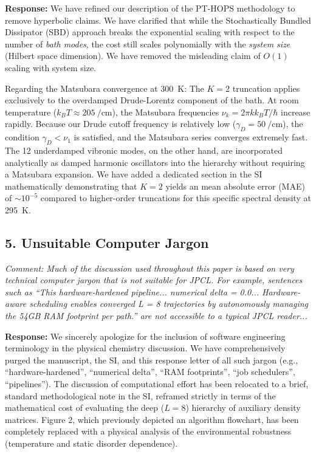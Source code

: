 \documentclass[11pt]{article}
\begin{document}
\textbf{Response:} We have refined our description of the PT-HOPS methodology to remove hyperbolic claims. We have clarified that while the Stochastically Bundled Dissipator (SBD) approach breaks the exponential scaling with respect to the number of \textit{bath modes}, the cost still scales polynomially with the \textit{system size} (Hilbert space dimension). We have removed the misleading claim of $O(1)$ scaling with system size.

Regarding the Matsubara convergence at \SI{300}{\kelvin}: The $K=2$ truncation applies exclusively to the overdamped Drude-Lorentz component of the bath. At room temperature ($k_B T \approx \SI{205}{\per\centi\meter}$), the Matsubara frequencies $\nu_k = 2\pi k k_B T / \hbar$ increase rapidly. Because our Drude cutoff frequency is relatively low ($\gamma_D = \SI{50}{\per\centi\meter}$), the condition $\gamma_D < \nu_1$ is satisfied, and the Matsubara series converges extremely fast. The 12 underdamped vibronic modes, on the other hand, are incorporated analytically as damped harmonic oscillators into the hierarchy without requiring a Matsubara expansion. We have added a dedicated section in the SI mathematically demonstrating that $K=2$ yields an mean absolute error (MAE) of $\sim 10^{-5}$ compared to higher-order truncations for this specific spectral density at \SI{295}{\kelvin}.

\subsection*{5. Unsuitable Computer Jargon}
\textit{Comment: Much of the discussion used throughout this paper is based on very technical computer jargon that is not suitable for JPCL. For example, sentences such as “This hardware-hardened pipeline... numerical delta = 0.0... Hardware-aware scheduling enables converged L = 8 trajectories by autonomously managing the 54GB RAM footprint per path.” are not accessible to a typical JPCL reader...}

\textbf{Response:} We sincerely apologize for the inclusion of software engineering terminology in the physical chemistry discussion. We have comprehensively purged the manuscript, the SI, and this response letter of all such jargon (e.g., ``hardware-hardened'', ``numerical delta'', ``RAM footprints'', ``job schedulers'', ``pipelines''). The discussion of computational effort has been relocated to a brief, standard methodological note in the SI, reframed strictly in terms of the mathematical cost of evaluating the deep ($L=8$) hierarchy of auxiliary density matrices. Figure 2, which previously depicted an algorithm flowchart, has been completely replaced with a physical analysis of the environmental robustness (temperature and static disorder dependence).
\end{document}
